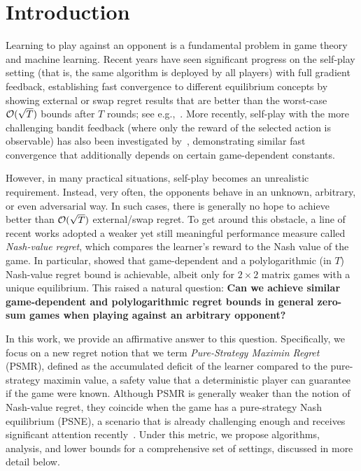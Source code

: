 \section{Introduction}



Learning to play against an opponent is a fundamental problem in game theory and machine learning.
Recent years have seen significant progress on the self-play setting (that is, the same algorithm is deployed by all players) with full gradient feedback,
establishing fast convergence to different equilibrium concepts by showing external or swap regret results that are better than the worst-case $\mathcal{O}(\sqrt{T})$ bounds after $T$ rounds; see e.g.,~\citet{rakhlin2013optimization, syrgkanis2015fast, daskalakis2021near, farina2022near, anagnostides2022near, anagnostides2022uncoupled, soleymani2025cautious}.
More recently, self-play with the more challenging bandit feedback (where only the reward of the selected action is observable) has also been investigated by~\citet{ito2025instancedependent}, demonstrating similar fast convergence that additionally depends on certain game-dependent constants.






However, in many practical situations, self-play becomes an unrealistic requirement.
Instead, very often, the opponents behave in an unknown, arbitrary, or even adversarial way.
In such cases, there is generally no hope to achieve better than $\mathcal{O}(\sqrt{T})$ external/swap regret.
To get around this obstacle, a line of recent works adopted a weaker yet still meaningful performance measure called \textit{Nash-value regret}, which compares the learner's reward to the Nash value of the game.
In particular, 
\citet{maiti2025limitations} showed that game-dependent and a polylogarithmic (in $T$) Nash-value regret bound is achievable, albeit only for $2\times 2$ matrix games with a unique equilibrium.
This raised a natural question: 
{\bfseries Can we achieve similar game-dependent and polylogarithmic regret bounds in general zero-sum games when playing against an arbitrary opponent?}



In this work, we provide an affirmative answer to this question.
Specifically, we focus on a new regret notion that we term \textit{Pure-Strategy Maximin Regret} (PSMR), defined as the accumulated deficit of the learner compared to the pure-strategy maximin value, %
a safety value that a deterministic player can guarantee if the game were known.
Although PSMR is generally weaker than the notion of Nash-value regret, they coincide when the game has a pure-strategy Nash equilibrium (PSNE), a scenario that is already challenging enough and receives significant attention recently~\citep{maiti2023instancedependent, maiti2024nearoptimal, 
ito2025instancedependent}.
Under this metric,
we propose algorithms, analysis, and lower bounds for a comprehensive set of settings, discussed in more detail below.

